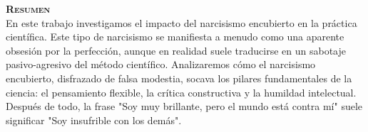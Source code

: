 {\LARGE \textbf{\textsc{Resumen}}}\\[0.5cm]

En este trabajo investigamos el impacto del narcisismo encubierto en la práctica científica. Este tipo de narcisismo se manifiesta a menudo como una aparente obsesión por la perfección, aunque en realidad suele traducirse en un sabotaje pasivo-agresivo del método científico. Analizaremos cómo el narcisismo encubierto, disfrazado de falsa modestia, socava los pilares fundamentales de la ciencia: el pensamiento flexible, la crítica constructiva y la humildad intelectual. Después de todo, la frase "Soy muy brillante, pero el mundo está contra mí" suele significar "Soy insufrible con los demás". 